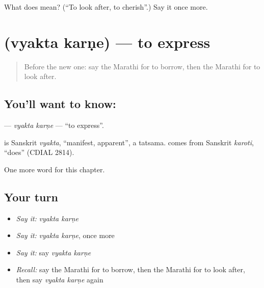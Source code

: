 \begin{tcolorbox}[breakable,colback=teal!4,colframe=teal!35!black,title={Before you move on}]
What does  mean? (\textquotedblleft{}To look after, to cherish\textquotedblright{}.) Say it once more.
\end{tcolorbox}
\section[\texorpdfstring{\mr{व्यक्त} \mr{करणे} (vyakta karṇe)}{व्यक्त करणे (vyakta karṇe)}]{  (vyakta karṇe) — to express}

\label{lesson:MR-C256-vyakta-karne}



\begin{quote}
Before the new one: say the Marathi for to borrow, then the Marathi for to look after.
\end{quote}

\subsection*{You'll want to know:  }
\textbf{ } — \emph{vyakta karṇe} — \textquotedblleft{}to express\textquotedblright{}.

\begin{cousinweb}
\textbf{} is Sanskrit \emph{vyakta}, \textquotedblleft{}manifest, apparent\textquotedblright{}, a tatsama. \textbf{} comes from Sanskrit \emph{karoti}, \textquotedblleft{}does\textquotedblright{} (CDIAL 2814).
\end{cousinweb}

\begin{grammarlens}[title={What you've built}]
One more word for this chapter.
\end{grammarlens}

\subsection*{Your turn}
\begin{itemize}
\raggedright
  \item \emph{Say it:} \emph{vyakta karṇe}
  \item \emph{Say it:} \emph{vyakta karṇe}, once more
  \item \emph{Say it:} say \emph{vyakta karṇe}
  \item \emph{Recall:} say the Marathi for to borrow, then the Marathi for to look after, then say \emph{vyakta karṇe} again
\end{itemize}

